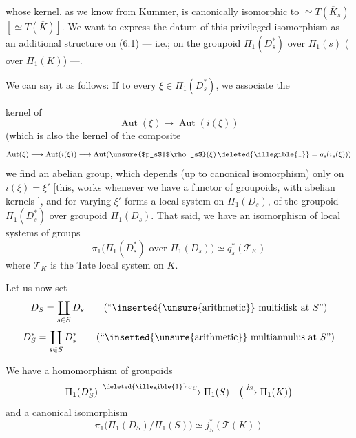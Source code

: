 whose kernel, as we know from Kummer, is canonically isomorphic to
$\simeq T(\overline K_s)$ $[\simeq T(\overline K)]$.
We want to express the datum of this privileged isomorphism as an additional
structure on (6.1) --- 
i.e.; on the groupoid $\Pi_1(D_s^*)$ over $\Pi_1(s)$
( over $\Pi_1(K)$) ---.

We can say it as follows:  If to every
\deleted{\unsure{$\xi$}} $\xi\in\Pi_1(D_s^*)$, we associate the



kernel of
\[
\operatorname{Aut}(\xi)\longrightarrow\operatorname{Aut}(i(\xi))
\]
(which is also the kernel of the composite
\[
\operatorname{Aut}(\xi)\longrightarrow\operatorname{Aut}(i(\xi))
\longrightarrow
\operatorname{Aut}(\text{\unsure{$p_s$|$\rho_s$}}(\xi)\,
\text{\deleted{\illegible{1}}}=q_s(i_s(\xi)))
\]
we find an \uline{abelian} group, which depends (up to canonical isomorphism)
only  on $i(\xi)=\xi'$
[this, 
works whenever we have
a functor
 of  groupoids,
with abelian kernels ],
and for varying $\xi'$ forms a local system on $\Pi_1(D_s)$,
of the groupoid $\Pi_1(D_s^*)$ over  groupoid
$\Pi_1(D_s)$. That said, we have an isomorphism of local systems of groups
\[
\pi_1\bigl(\Pi_1(D_s^*)\text{ over }\Pi_1(D_s)\bigr)
\simeq q_s^*(\mathcal T_K)
\]
where $\mathcal T_K$ is the Tate local system on $K$.



Let us now set
\[
D_S=\coprod_{s\in S}D_s
\qquad\text{(``\inserted{\unsure{arithmetic}} multidisk at $S$'')}
\]
\[
D_S^*=\coprod_{s\in S}D_s^*
\qquad\text{(``\inserted{\unsure{arithmetic}} multiannulus at $S$'')}
\]

We have a homomorphism of groupoids
\[
\Pi_1(D_S^*)
\xrightarrow{\text{\deleted{\illegible{1}}}\,\sigma_S}
\Pi_1(S)
\quad\bigl(\xrightarrow{j_S}\Pi_1(K)\bigr)
\]
and a canonical isomorphism
\[
\pi_1\bigl(\Pi_1(D_S)/\Pi_1(S)\bigr)
\simeq
j_S^*(\mathcal T(K))
\]

